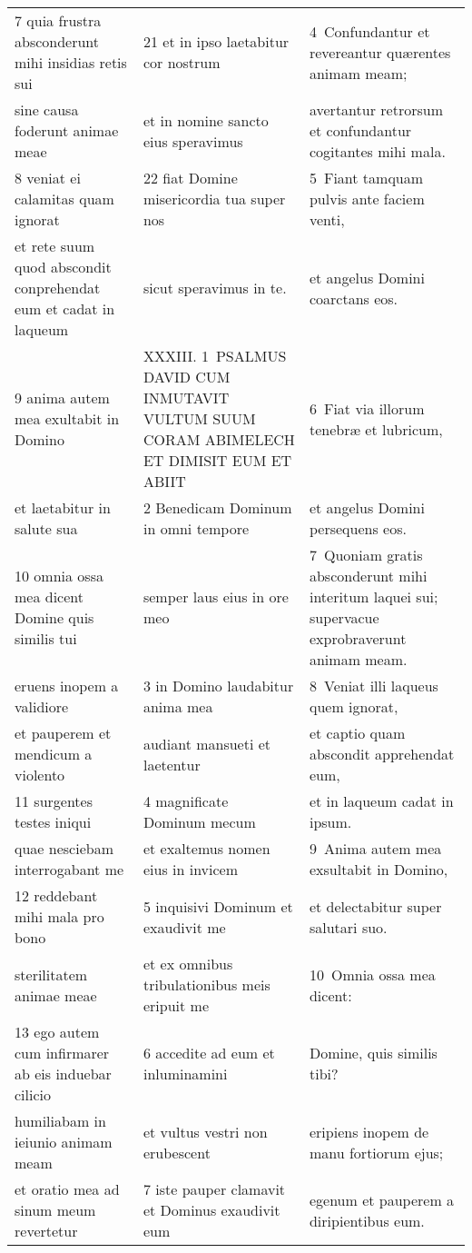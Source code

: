 \documentclass{article}
\begin{document}
\begin{longtable}{@{}p{}p{}p{}@{}}
7 quia frustra absconderunt mihi insidias retis sui	&	21 et in ipso laetabitur cor nostrum	&	4 Confundantur et revereantur quærentes animam meam;	\\
sine causa foderunt animae meae	&	et in nomine sancto eius speravimus	&	avertantur retrorsum et confundantur cogitantes mihi mala.	\\
8 veniat ei calamitas quam ignorat	&	22 fiat Domine misericordia tua super nos	&	5 Fiant tamquam pulvis ante faciem venti,	\\
et rete suum quod abscondit conprehendat eum et cadat in laqueum	&	sicut speravimus in te.	&	et angelus Domini coarctans eos.	\\
9 anima autem mea exultabit in Domino	&	XXXIII. 1 PSALMUS DAVID CUM INMUTAVIT VULTUM SUUM CORAM ABIMELECH ET DIMISIT EUM ET ABIIT	&	6 Fiat via illorum tenebræ et lubricum,	\\
et laetabitur in salute sua	&	2 Benedicam Dominum in omni tempore	&	et angelus Domini persequens eos.	\\
10 omnia ossa mea dicent Domine quis similis tui	&	semper laus eius in ore meo	&	7 Quoniam gratis absconderunt mihi interitum laquei sui; supervacue exprobraverunt animam meam.	\\
eruens inopem a validiore	&	3 in Domino laudabitur anima mea	&	8 Veniat illi laqueus quem ignorat,	\\
et pauperem et mendicum a violento	&	audiant mansueti et laetentur	&	et captio quam abscondit apprehendat eum,	\\
11 surgentes testes iniqui	&	4 magnificate Dominum mecum	&	et in laqueum cadat in ipsum.	\\
quae nesciebam interrogabant me	&	et exaltemus nomen eius in invicem	&	9 Anima autem mea exsultabit in Domino,	\\
12 reddebant mihi mala pro bono	&	5 inquisivi Dominum et exaudivit me	&	et delectabitur super salutari suo.	\\
sterilitatem animae meae	&	et ex omnibus tribulationibus meis eripuit me	&	10 Omnia ossa mea dicent:	\\
13 ego autem cum infirmarer ab eis induebar cilicio	&	6 accedite ad eum et inluminamini	&	Domine, quis similis tibi?	\\
humiliabam in ieiunio animam meam	&	et vultus vestri non erubescent	&	eripiens inopem de manu fortiorum ejus;	\\
et oratio mea ad sinum meum revertetur	&	7 iste pauper clamavit et Dominus exaudivit eum	&	egenum et pauperem a diripientibus eum.	\\

\end{longtable}
\end{document}
